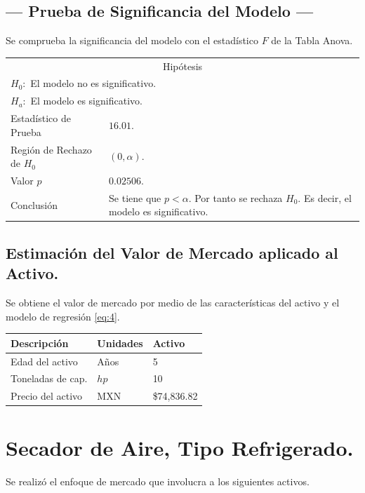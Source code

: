 \subsection{\centering --- Prueba de Significancia del Modelo ---} %
Se comprueba la significancia del modelo con el estadístico \(F\) de la Tabla Anova.
\begin{center}
  \begin{tabular}{|l|p{6cm}|}
    \cline{1-2}
    \multicolumn{2}{|c|}{Hipótesis}\\ \cline{1-2}
    \multicolumn{2}{|l|}{\(H_0:\) El modelo no es significativo.} \\ 
    \multicolumn{2}{|l|}{\(H_a:\) El modelo es significativo.} \\ \cline{1-2}
    Estadístico de Prueba & \(16.01\).\\ \cline{1-2} 
		Región de Rechazo de \(H_0\) & \((0, \alpha )\).\\ \cline{1-2} 
    Valor \(p\) & \(0.02506\).\\ \cline{1-2} 
    Conclusión & Se tiene que \(p<\alpha\). \newline 
		Por tanto se rechaza \(H_0\). \newline 
		Es decir, el modelo es significativo.\\ \cline{1-2} 
  \end{tabular}
\end{center} 

\subsection{\centering Estimación del Valor de Mercado aplicado al Activo.} %
Se obtiene el valor de mercado por medio de las características del activo y el modelo de regresión \eqref{eq:4}.
\begin{center}
  \begin{tabular}{|l|l|l|}
    \hline 
		Descripción   & Unidades  & Activo \\ \hline 
    Edad del activo    & Años      & 5      \\ \hline 
		Toneladas de cap.  & \(hp\) & 10   \\ \hline 
		Precio del activo   & MXN       & \$74,836.82   \\ \hline 
  \end{tabular}
\end{center} 


\section{Secador de Aire, Tipo Refrigerado.} %
Se realizó el enfoque de mercado que involucra a los siguientes activos.

